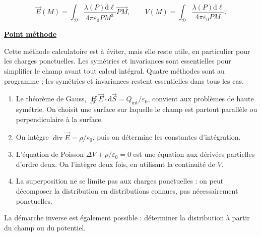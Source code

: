 \documentclass[11pt,a4paper]{article}
\newif\ifinexample
\newcommand{\dd}{\mathrm d}
\newcommand{\titr}[1]{\par\ifinexample\else\Needspace{4\baselineskip}\fi\textbf{\underline{#1}}\par\nopagebreak[3]}
\newcommand{\stars}[1]{\mathord{\star}\ifnum#1>1\mkern5mu\mathord{\star}\fi\ifnum#1>2\mkern5mu\mathord{\star}\fi\ifnum#1>3\mkern5mu\mathord{\star}\fi\ifnum#1>4\mkern5mu\mathord{\star}\fi\ifnum#1>5\mkern5mu\mathord{\star}\fi}
\newenvironment{result}[1][4]{\begin{cadre}[etoiles={\stars{#1}}]}{\end{cadre}}
\newcommand{\divg}{\operatorname{div}}\newcommand{\sy}{\operatorname{sym}}
\newcommand{\D}{\mathcal D}\newcommand{\R}{\mathcal R}
\newcommand{\eps}{\varepsilon_0}\newcommand{\E}{\vec E}\newcommand{\dS}{\dd\vec S}\newcommand{\dM}{\dd\vec M}
\begin{document}
\begin{result}[2]\[\E(M)=\int_\D\frac{\lambda(P)\dd\ell}{4\pi\eps PM^3}\overrightarrow{PM},\qquad V(M)=\int_\D\frac{\lambda(P)\dd\ell}{4\pi\eps PM}.\]\end{result}
\titr{Point méthode}
Cette méthode calculatoire est à éviter, mais elle reste utile, en particulier pour les charges ponctuelles. Les symétries et invariances sont essentielles pour simplifier le champ avant tout calcul intégral.
Quatre méthodes sont au programme ; les symétries et invariances restent essentielles dans tous les cas.
\begin{enumerate}
\item Le théorème de Gauss, $\oiint\E\cdot\dS=Q_{\mathrm{int}}/\eps$, convient aux problèmes de haute symétrie. On choisit une surface sur laquelle le champ est partout parallèle ou perpendiculaire à la surface.
\item On intègre $\divg\E=\rho/\eps$, puis on détermine les constantes d'intégration.
\item L'équation de Poisson $\Delta V+\rho/\eps=0$ est une équation aux dérivées partielles d'ordre deux. On l'intègre deux fois, en utilisant la continuité de $V$.
\item La superposition ne se limite pas aux charges ponctuelles : on peut décomposer la distribution en distributions connues, pas nécessairement ponctuelles.
\end{enumerate}
La démarche inverse est également possible : déterminer la distribution à partir du champ ou du potentiel.
\end{document}
